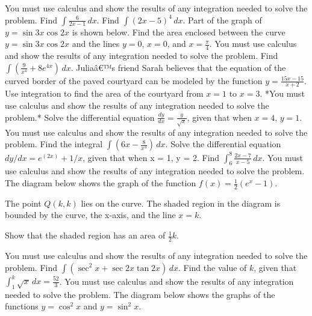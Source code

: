 \documentclass[12pt,addpoints]{exam}
\begin{document}
\begin{questions}
You must use calculus and show the results of any integration needed to solve the problem.
\fillwithlines{5cm}
\question[5] Find \(\int \frac{6}{2x-1} \, dx\).
\fillwithlines{5cm}
\question[5] Find \(\int (2x-5)^4 \, dx\).
\fillwithlines{5cm}
\question[5] Part of the graph of \( y = \sin 3x \cos 2x \) is shown below. Find the area enclosed between the curve \( y = \sin 3x \cos 2x \) and the lines \( y = 0 \), \( x = 0 \), and \( x = \frac{\pi}{4} \). You must use calculus and show the results of any integration needed to solve the problem.
\fillwithlines{5cm}
\question[5] Find \(\int \left( \frac{9}{x^4} + 8e^{4x} \right) \, dx\).
\fillwithlines{5cm}
\question[5] Juliaâ€™s friend Sarah believes that the equation of the curved border of the paved courtyard can be modeled by the function \( y = \frac{15x - 15}{x + 2} \). Use integration to find the area of the courtyard from \( x = 1 \) to \( x = 3 \). *You must use calculus and show the results of any integration needed to solve the problem.*
\fillwithlines{5cm}
\question[5] Solve the differential equation \(\frac{dy}{dx} = \frac{y}{\sqrt{x}}\), given that when \(x = 4\), \(y = 1\). You must use calculus and show the results of any integration needed to solve the problem.
\fillwithlines{5cm}
\question[5] Find the integral \(\int \left( 6x - \frac{8}{x^3} \right) \, dx\).
\fillwithlines{5cm}
\question[5] Solve the differential equation \(dy/dx = e^(2x) + 1/x\), given that when x = 1, y = 2.
\fillwithlines{5cm}
\question[5] Find \(\int_{6}^{8} \frac{2x - 7}{x - 5} \, dx\). You must use calculus and show the results of any integration needed to solve the problem.
\fillwithlines{5cm}
\question[5] The diagram below shows the graph of the function \( f(x) = \frac{1}{2} (e^x - 1) \).

The point \( Q(k, k) \) lies on the curve.  
The shaded region in the diagram is bounded by the curve, the x-axis, and the line \( x = k \).

Show that the shaded region has an area of \( \frac{1}{2} k \).

You must use calculus and show the results of any integration needed to solve the problem.
\fillwithlines{5cm}
\question[5] Find \(\int (\sec^2 x + \sec 2x \tan 2x) \, dx\).
\fillwithlines{5cm}
\question[5] Find the value of \( k \), given that \(\int_1^k \sqrt{x} \, dx = \frac{52}{3}\). You must use calculus and show the results of any integration needed to solve the problem.
\fillwithlines{5cm}
\question[5] The diagram below shows the graphs of the functions \( y = \cos^2 x \) and \( y = \sin^2 x \).


\end{questions}
\end{document}
